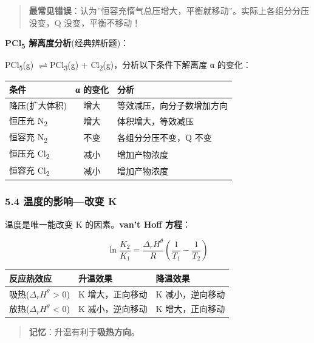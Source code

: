 \documentclass[a4paper,11pt]{ctexart}
\newcounter{none}
\newcommand{\箭}{\ensuremath{\rightarrow}}
\newcommand{\左箭}{\ensuremath{\leftarrow}}
\newcommand{\上箭}{\ensuremath{\uparrow}}
\newcommand{\下箭}{\ensuremath{\downarrow}}
\newcommand{\衡}{\ensuremath{\rightleftharpoons}}
\newcommand{\双箭}{\ensuremath{\leftrightarrow}}
\newcommand{\约等于}{\ensuremath{\approx}}
\newcommand{\小于等于}{\ensuremath{\leq}}
\newcommand{\大于等于}{\ensuremath{\geq}}
\newcommand{\不等于}{\ensuremath{\neq}}
\newcommand{\西格马}{\ensuremath{\sigma}}
\newcommand{\派}{\ensuremath{\pi}}
\begin{document}
\begin{quote}
\textbf{最常见错误}：认为''恒容充惰气总压增大，平衡就移动''。实际上各组分分压没变，Q 没变，平衡不移动！
\end{quote}

\textbf{PCl\textsubscript{5} 解离度分析}(经典辨析题)：

PCl\textsubscript{5}(g) \衡 PCl\textsubscript{3}(g) + Cl\textsubscript{2}(g)，分析以下条件下解离度 α 的变化：

{\def\LTcaptype{none} %
\begin{longtable}[]{@{}lcl@{}}
\toprule\noalign{}
条件 & α 的变化 & 分析 \\
\midrule\noalign{}
\endhead
\bottomrule\noalign{}
\endlastfoot
降压(扩大体积) & 增大 & 等效减压，向分子数增加方向 \\
恒压充 N\textsubscript{2} & 增大 & 体积增大，等效减压 \\
恒容充 N\textsubscript{2} & 不变 & 各组分分压不变，Q 不变 \\
恒压充 Cl\textsubscript{2} & 减小 & 增加产物浓度 \\
恒容充 Cl\textsubscript{2} & 减小 & 增加产物浓度 \\
\end{longtable}
}

\subsubsection{5.4 温度的影响---改变 K}\label{ux6e29ux5ea6ux7684ux5f71ux54cdux6539ux53d8-k}

温度是唯一能改变 K 的因素。\textbf{van't Hoff 方程}：

\[
\boxed{\ln\frac{K_2}{K_1} = \frac{\Delta_r H^\theta}{R}\left(\frac{1}{T_1} - \frac{1}{T_2}\right)}
\]

{\def\LTcaptype{none} %
\begin{longtable}[]{@{}lll@{}}
\toprule\noalign{}
反应热效应 & 升温效果 & 降温效果 \\
\midrule\noalign{}
\endhead
\bottomrule\noalign{}
\endlastfoot
吸热(\(\Delta_r H^\theta\) \textgreater{} 0) & K 增大，正向移动 & K 减小，逆向移动 \\
放热(\(\Delta_r H^\theta\) \textless{} 0) & K 减小，逆向移动 & K 增大，正向移动 \\
\end{longtable}
}

\begin{quote}
\textbf{记忆}：升温有利于\textbf{吸热方向}。
\end{quote}
\end{document}
